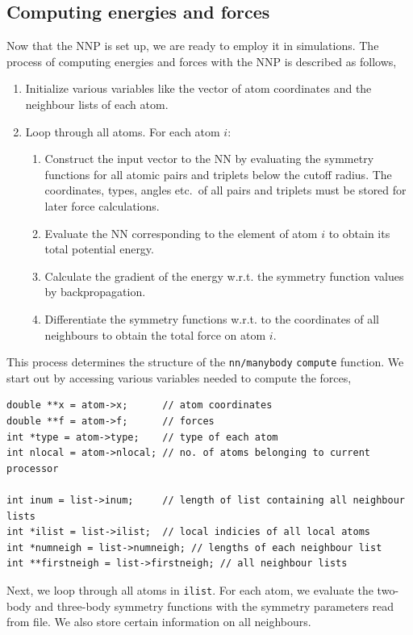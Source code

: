 \documentclass[twoside,english]{uiofysmaster}
\begin{document}
\subsection{Computing energies and forces}
Now that the NNP is set up, we are ready to employ it in simulations. 
The process of computing energies and forces with the NNP is described as follows,
\begin{enumerate}
 \item Initialize various variables like the vector of atom coordinates and the neighbour lists of each atom.
 \item Loop through all atoms. For each atom $i$:
 \begin{enumerate}
  \item Construct the input vector to the NN by evaluating the symmetry functions for all 
        atomic pairs and triplets below the cutoff radius. 
	The coordinates, types, angles etc.\ of all pairs and triplets must be stored for later force calculations. 
  \item Evaluate the NN corresponding to the element of atom $i$ to obtain its total potential energy.
  \item Calculate the gradient of the energy w.r.t. the symmetry function values by backpropagation.
  \item Differentiate the symmetry functions w.r.t. to the coordinates of all neighbours to obtain the total force on atom $i$.
 \end{enumerate}
\end{enumerate}
This process determines the structure of the \texttt{nn/manybody} \texttt{compute} function. 
We start out by accessing various variables needed to compute the forces,
\begin{verbatim}
double **x = atom->x;      // atom coordinates
double **f = atom->f;      // forces
int *type = atom->type;    // type of each atom	
int nlocal = atom->nlocal; // no. of atoms belonging to current processor  

int inum = list->inum;     // length of list containing all neighbour lists
int *ilist = list->ilist;  // local indicies of all local atoms
int *numneigh = list->numneigh; // lengths of each neighbour list
int **firstneigh = list->firstneigh; // all neighbour lists
\end{verbatim}
Next, we loop through all atoms in \texttt{ilist}. For each atom, we evaluate 
the two-body and three-body symmetry functions with the symmetry parameters read from file. 
We also store certain information on all neighbours. 
\end{document}
